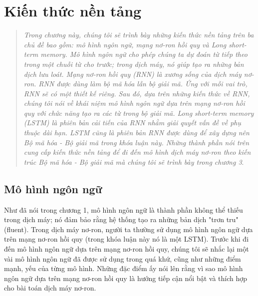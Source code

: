 \chapter{Kiến thức nền tảng}
\ifpdf
    \graphicspath{{Chapter2/Chapter2Figs/PNG/}{Chapter2/Chapter2Figs/PDF/}{Chapter2/Chapter2Figs/}}
\else
    \graphicspath{{Chapter2/Chapter2Figs/EPS/}{Chapter2/Chapter2Figs/}}
\fi
\label{chap_2}
\begin{quote}

\textit{Trong chương này, chúng tôi sẽ trình bày những kiến thức nền tảng trên ba chủ đề bao gồm: mô hình ngôn ngữ, mạng nơ-ron hồi quy và Long short-term memory. Mô hình ngôn ngữ cho phép chúng ta dự đoán từ tiếp theo trong một chuỗi từ cho trước; trong dịch máy, nó giúp tạo ra những bản dịch lưu loát. Mạng nơ-ron hồi quy (RNN) là xương sống của dịch máy nơ-ron. RNN được dùng làm bộ mã hóa lẫn bộ giải mã. Ứng với mỗi vai trò, RNN sẽ có một thiết kế riêng. Sau đó, dựa trên những kiến thức về RNN, chúng tôi nói về khái niệm mô hình ngôn ngữ dựa trên mạng nơ-ron hồi quy với chức năng tạo ra các từ trong bộ giải mã. Long short-term memory (LSTM) là phiên bản cải tiến của RNN nhằm giải quyết vấn đề về phụ thuộc dài hạn. LSTM cũng là phiên bản RNN được dùng để xây dựng nên Bộ mã hóa - Bộ giải mã trong khóa luận này. Những thành phần nói trên cung cấp kiến thức nền tảng để đi đến mô hình dịch máy nơ-ron theo kiến trúc Bộ mã hóa - Bộ giải mã mà chúng tôi sẽ trình bày trong chương 3}.

\end{quote}

\section{Mô hình ngôn ngữ}

Như đã nói trong chương 1, mô hình ngôn ngữ là thành phần không thể thiếu trong dịch máy; nó đảm bảo rằng hệ thống tạo ra những bản dịch "trơn tru" (fluent). Trong dịch máy nơ-ron, người ta thường sử dụng mô hình ngôn ngữ dựa trên mạng nơ-ron hồi quy (trong khóa luận này nó là một LSTM). Trước khi đi đến mô hình ngôn ngữ dựa trên mạng nơ-ron hồi quy, chúng tôi sẽ nhắc lại một vài mô hình ngôn ngữ đã được sử dụng trong quá khứ, cũng như những điểm mạnh, yếu của từng mô hình. Những đặc điểm ấy nói lên rằng vì sao mô hình ngôn ngữ dựa trên mạng nơ-ron hồi quy là hướng tiếp cận nổi bật và thích hợp cho bài toán dịch máy nơ-ron.

